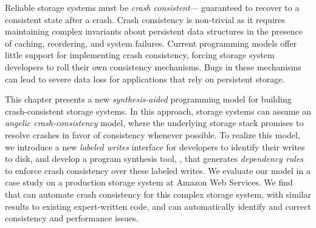 Reliable storage systems must be \emph{crash consistent}---%
guaranteed to recover to a consistent state after a crash. %
Crash consistency is non-trivial
as it requires maintaining complex invariants
about persistent data structures 
in the presence of caching, reordering, and system failures.
Current programming models offer little support for implementing crash consistency,
forcing storage system developers to roll their own consistency mechanisms.
Bugs in these mechanisms can lead to severe data loss
for applications that rely on persistent storage.\tighten

This chapter presents a new \emph{synthesis-aided} programming model
for building crash-consistent storage systems.
In this approach, storage systems can assume
an \emph{angelic crash-consistency} model,
where the underlying storage stack
promises to resolve crashes in favor of consistency whenever possible.
To realize this model,
we introduce a new \emph{labeled writes} interface for developers to identify their writes to disk,
and develop a program synthesis tool, \depsynth,
that generates \emph{dependency rules}
to enforce crash consistency over these labeled writes.
We evaluate our model in a case study
on a production storage system at Amazon Web Services.
We find that \depsynth can automate crash consistency for this complex storage system,
with similar results to existing expert-written code,
and can automatically identify and correct consistency and performance issues.
